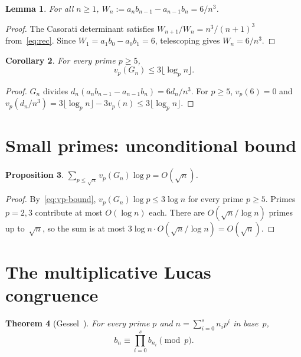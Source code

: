 \documentclass[11pt]{article}
\newtheorem{theorem}{Theorem}
\newtheorem{lemma}[theorem]{Lemma}
\newtheorem{proposition}[theorem]{Proposition}
\newtheorem{corollary}[theorem]{Corollary}
\theoremstyle{definition}
\theoremstyle{remark}
\begin{document}
\begin{lemma}\label{lem:wronsk}
For all $n \ge 1$,
$W_n := a_n b_{n-1} - a_{n-1} b_n = 6/n^3$.
\end{lemma}

\begin{proof}
The Casorati determinant satisfies
$W_{n+1}/W_n = n^3/(n+1)^3$ from~\eqref{eq:rec}.
Since $W_1 = a_1 b_0 - a_0 b_1 = 6$, telescoping gives $W_n = 6/n^3$.
\end{proof}

\begin{corollary}\label{cor:divides}
For every prime $p \ge 5$,
\begin{equation}\label{eq:vp-bound}
v_p(G_n) \le 3\lfloor \log_p n \rfloor.
\end{equation}
\end{corollary}

\begin{proof}
$G_n$ divides $d_n(a_n b_{n-1} - a_{n-1} b_n) = 6d_n/n^3$.
For $p \ge 5$, $v_p(6) = 0$ and
$v_p(d_n/n^3) = 3\lfloor\log_p n\rfloor - 3v_p(n)
\le 3\lfloor \log_p n\rfloor$.
\end{proof}

\section{Small primes: unconditional bound}

\begin{proposition}\label{prop:small}
$\displaystyle\sum_{p \le \sqrt{n}} v_p(G_n) \log p = O(\sqrt{n})$.
\end{proposition}

\begin{proof}
By~\eqref{eq:vp-bound}, $v_p(G_n) \log p \le 3\log n$
for every prime $p \ge 5$.
Primes $p = 2, 3$ contribute at most $O(\log n)$ each.
There are $O(\sqrt{n}/\log n)$ primes up to~$\sqrt{n}$, so the sum
is at most $3\log n \cdot O(\sqrt{n}/\log n) = O(\sqrt{n})$.
\end{proof}

\section{The multiplicative Lucas congruence}

\begin{theorem}[Gessel~{\cite{Gessel1982}}]\label{thm:lucas}
For every prime $p$ and $n = \sum_{i=0}^s n_i p^i$ in base~$p$,
\begin{equation}\label{eq:lucas}
b_n \equiv \prod_{i=0}^s b_{n_i} \pmod{p}.
\end{equation}
\end{theorem}
\end{document}
